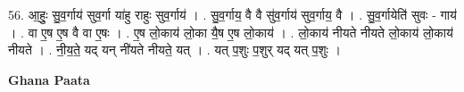 \documentclass[17pt]{extarticle}
\begin{document}
56. आ॒हुः॒ सु॒व॒र्गाय॑ सुव॒र्गा या॑हु राहुः सुव॒र्गाय॑ । . सु॒व॒र्गाय॒ वै वै सु॑व॒र्गाय॑ सुव॒र्गाय॒ वै । . सु॒व॒र्गायेति॑ सुवः - गाय॑ । . वा ए॒ष ए॒ष वै वा ए॒षः । . ए॒ष लो॒काय॑ लो॒का यै॒ष ए॒ष लो॒काय॑ । . लो॒काय॑ नीयते नीयते लो॒काय॑ लो॒काय॑ नीयते । . नी॒य॒ते॒ यद् यन् नी॑यते नीयते॒ यत् । . यत् प॒शुः प॒शुर् यद् यत् प॒शुः । \newline

\textbf{Ghana Paata } \newline
\end{document}
